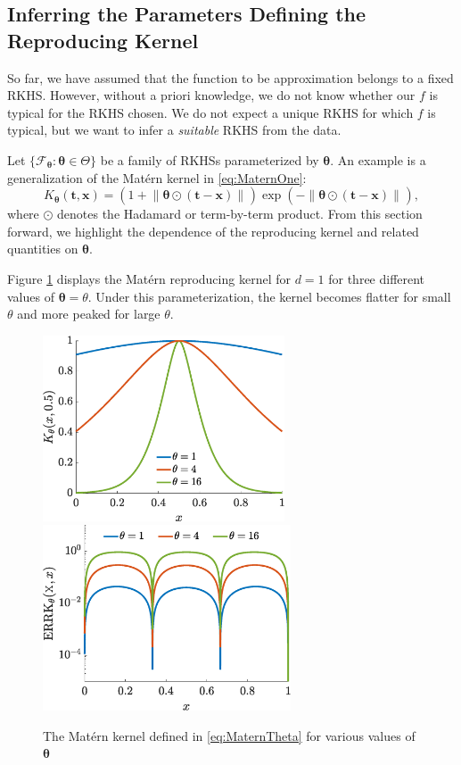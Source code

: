 \documentclass[]{mcom-l}
\theoremstyle{theorem}
\theoremstyle{remark}
\newcommand{\bx}{{\boldsymbol{x}}}
\newcommand{\bt}{{\boldsymbol{t}}}
\newcommand{\btheta}{{\boldsymbol{\theta}}}
\newcommand{\calf}{{\mathcal{F}}}
\newcommand{\norm}[2][{}]{\ensuremath{\left \lVert #2 \right \rVert}_{#1}}
\begin{document}
\subsection{Inferring the Parameters Defining the Reproducing Kernel} \label{sec:adaptTheta}

So far, we have assumed that the function to be approximation belongs to a fixed RKHS.  However, without  a priori knowledge, we do not know whether our $f$ is typical for  the RKHS chosen.  We do not expect a unique RKHS for which $f$ is typical, but we want to infer a \emph{suitable} RKHS from the data.  

Let $\{\calf_{\btheta} : \btheta \in \Theta\}$ be a family of RKHSs parameterized by $\btheta$.  An example is a generalization of the Mat\'ern kernel  in \eqref{eq:MaternOne}:
\begin{equation} \label{eq:MaternTheta}
K_\btheta(\bt,\bx) = (1 +  \norm{\btheta \odot (\bt-\bx)}) \exp(-\norm{\btheta \odot (\bt-\bx)}),
\end{equation}
where $\odot$ denotes the Hadamard or term-by-term product.  From this section forward, we highlight the dependence of the reproducing kernel and related quantities on $\btheta$.

Figure \ref{fig:MaternThPlot} displays the Mat\'ern reproducing kernel for $d=1$ for three different values of $\btheta = \theta$.  Under this parameterization, the kernel becomes flatter for small $\theta$ and more peaked for large $\theta$.  

\begin{figure}[H]
	\centering
	\includegraphics[height = 5.5cm]{ProgramsImages/KthetaPlot.eps} \qquad
	\includegraphics[height = 5.5cm]{ProgramsImages/errKplotth.eps}
	\caption{The Mat\'ern kernel defined in \eqref{eq:MaternTheta} for various values of $\btheta$ \label{fig:MaternThPlot}}
\end{figure}
\end{document}
